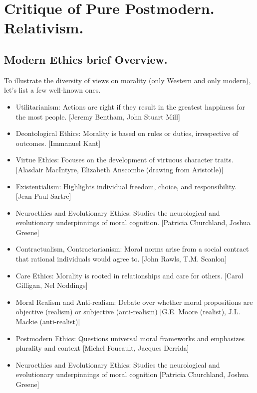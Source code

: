 \documentclass[11pt,a4]{article}
\begin{document}
\newpage
\section{Critique of Pure Postmodern. Relativism.}


\subsection{Modern Ethics brief Overview.}

        To illustrate the diversity of views on morality (only Western and only modern), let's list a few well-known ones.

        \begin{itemize}
            \item Utilitarianism: Actions are right if they result in the
            greatest happiness for the most people. [Jeremy Bentham, John Stuart Mill]

            \item Deontological Ethics: Morality is based on rules or duties, irrespective of outcomes. [Immanuel Kant]
            \item Virtue Ethics: Focuses on the development of virtuous character traits. [Alasdair MacIntyre, Elizabeth Anscombe (drawing from Aristotle)]
            \item Existentialism: Highlights individual freedom, choice, and responsibility. [Jean-Paul Sartre]
            \item Neuroethics and Evolutionary Ethics:  Studies the neurological and evolutionary underpinnings of moral cognition. [Patricia Churchland, Joshua Greene]
            \item Contractualism, Contractarianism: Moral norms arise from a social contract that rational individuals
                  would agree to. [John Rawls, T.M. Scanlon]


            \item Care Ethics: Morality is rooted in relationships and care for others.
                [Carol Gilligan, Nel Noddings]

            \item Moral Realism and Anti-realism:
                 Debate over whether moral propositions are objective (realism)
                or subjective (anti-realism)
                [G.E. Moore (realist), J.L. Mackie (anti-realist)]

            \item Postmodern Ethics:
                 Questions universal moral frameworks and emphasizes plurality and context
                [Michel Foucault, Jacques Derrida]

            \item Neuroethics and Evolutionary Ethics:
                Studies the neurological and evolutionary underpinnings of moral cognition
                [Patricia Churchland, Joshua Greene]


        \end{itemize}
\end{document}
